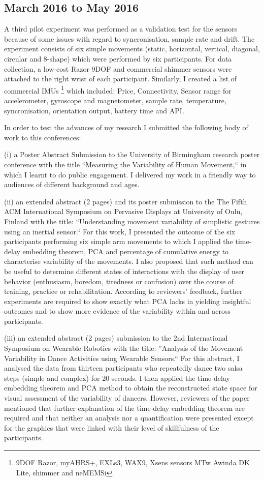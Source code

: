 \documentclass[9pt,journal,onecolumn,compsoc]{IEEEtran}
\begin{document}
\subsection{March 2016 to May 2016}

A third pilot experiment was performed as a validation test
for the sensors because of some issues with regard to syncronisation, sample rate and drift.
The experiment consists of six simple movements
(static, horizontal, vertical, diagonal, circular and 8-shape)
which were performed by six participants.
For data collection, a low-cost Razor 9DOF and commercial shimmer sensors were attached to the right wrist of each participant.
Similarly, I created a list of commercial IMUs
\footnote{9DOF Razor, myAHRS+, EXLs3, WAX9, Xsens sensors MTw Awinda DK Lite, shimmer and neMEMSi}
which included:
Price, Connectivity, Sensor range for accelerometer, gyroscope and magnetometer,
sample rate, temperature, syncronisation, orientation output, battery time and API.

In order to test the advances of my research
I submitted the following body of work to this conferences:

(i) a Poster Abstract Submission to the University of Birmingham research poster conference
with the title ``Measuring the Variability of Human Movement,``
in which I learnt to do public engagement. I delivered my work in a friendly way to audiences of
different background and ages.

(ii) an extended abstract (2 pages) and its poster submission to the The Fifth ACM International
Symposium on Pervasive Displays at University of Oulu, Finland with the title:
``Understanding movement variability of simplistic gestures using an inertial sensor.``
For this work, I presented the outcome of the six participants performing six simple arm movements
to which I applied the time-delay embedding theorem, PCA and percentage of cumulative energy
to characterise variability of the movements.
I also proposed that such method can be useful
to determine different states of interactions with the display of user behavior
(enthusiasm, boredom, tiredness or confusion) over the course of training, practice or rehabilitation.
According to reviewers' feedback,
further experiments are required to show exactly what PCA lacks in yielding insightful outcomes
and to show more evidence of the variability within and across participants.

(iii) an extended abstract (2 pages) submission to the 2nd International Symposium on Wearable Robotics
with the title: ''Analysis of the Movement Variability in Dance Activities using Wearable Sensors.``
For this abstract,
I analysed the data from thirteen participants who repeatedly dance two salsa steps (simple and complex) for 20 seconds.
I then applied the time-delay embedding theorem and PCA method to obtain the reconstructed state space
for visual assessment of the variability of dancers.
However, reviewers of the paper mentioned that further explanation of the time-delay embedding theorem are required
and that neither an analysis nor a quantification were presented except for the
graphics that were linked with their level of skillfulness of the participants.
\end{document}
